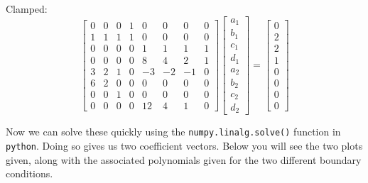 \documentclass[11pt]{article}
\begin{document}
\begin{enumerate}
            Clamped:
            \[
                \left[
                \begin{array}{cccccccc}
                    0 & 0 & 0 & 1 & 0 & 0 & 0 & 0   \\
                    1 & 1 & 1 & 1 & 0 & 0 & 0 & 0   \\
                    0 & 0 & 0 & 0 & 1 & 1 & 1 & 1   \\
                    0 & 0 & 0 & 0 & 8 & 4 & 2 & 1   \\
                    \hline  
                    3 & 2 & 1 & 0 &-3 &-2 &-1 & 0   \\
                    \hline
                    6 & 2 & 0 & 0 & 0 & 0 & 0 & 0   \\
                    \hline
                    0 & 0 & 1 & 0 & 0 & 0 & 0 & 0   \\
                    0 & 0 & 0 & 0 &12 & 4 & 1 & 0   
                \end{array}
                \right]
                \begin{bmatrix}
                    a_1 \\ b_1 \\ c_1 \\ d_1 \\ a_2 \\ b_2 \\ c_2 \\ d_2
                \end{bmatrix}
                =
                \begin{bmatrix}
                    0 \\ 2 \\ 2 \\ 1 \\ 0 \\ 0 \\ 0 \\ 0 
                \end{bmatrix}
            \]

            Now we can solve these quickly using the \texttt{numpy.linalg.solve()}
            function in \texttt{python}. Doing so gives us two coefficient
            vectors. Below you will see the two plots given, along with the
            associated polynomials given for the two different boundary
            conditions. 


\end{enumerate}
\end{document}
